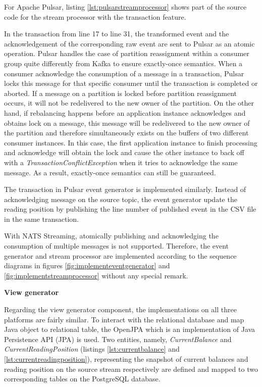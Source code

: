 For Apache Pulsar, listing \ref{lst:pulsarstreamprocessor} shows part of the source code for the stream processor with the transaction feature. 

 

In the transaction from line 17 to line 31, the transformed event and the acknowledgement of the corresponding raw event are sent to Pulsar as an atomic operation. Pulsar handles the case of partition reassignment within a consumer group quite differently from Kafka to ensure exactly-once semantics. When a consumer acknowledge the consumption of a message in a transaction, Pulsar locks this message for that specific consumer \cite{pulsartransaction} until the transaction is completed or aborted. If a message on a partition is locked before partition reassignment occurs, it will not be redelivered to the new owner of the partition. On the other hand, if rebalancing happens before an application instance acknowledges and obtains lock on a message, this message will be redelivered to the new owner of the partition and therefore simultaneously exists on the buffers of two different consumer instances. In this case, the first application instance to finish processing and acknowledge will obtain the lock and cause the other instance to back off with a \emph{TransactionConflictException} when it tries to acknowledge the same message. As a result, exactly-once semantics can still be guaranteed.

The transaction in Pulsar event generator is implemented similarly. Instead of acknowledging message on the source topic, the event generator update the reading position by publishing the line number of published event in the CSV file in the same transaction. 

With NATS Streaming, atomically publishing and acknowledging the consumption of multiple messages is not supported. Therefore, the event generator and stream processor are implemented according to the sequence diagrams in figures \ref{fig:implementeventgenerator} and \ref{fig:implementstreamprocessor} without any special remark.

\textbf{View generator}

Regarding the view generator component, the implementations on all three platforms are fairly similar. To interact with the relational database and map Java object to relational table, the OpenJPA which is an implementation of Java Persistence API (JPA) \cite{jpa} is used. Two entities, namely, \emph{CurrentBalance} and \emph{CurrentReadingPosition} (listings \ref{lst:currentbalance} and \ref{lst:currentreadingposition}), representing the snapshot of current balances and reading position on the source stream respectively are defined and mapped to two corresponding tables on the PostgreSQL database.   
\newpage

